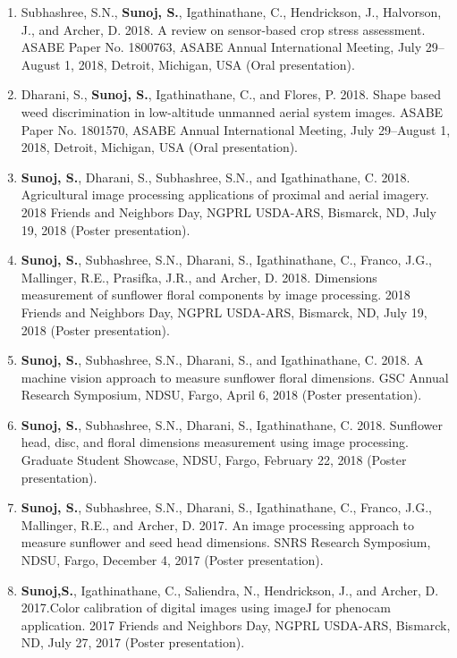 \documentclass[11pt]{article}
\begin{document}
\begin{enumerate}[itemsep=-2pt]
\item Subhashree, S.N., \textbf{Sunoj, S.}, Igathinathane, C., Hendrickson, J., Halvorson, J., and Archer, D. 2018. A review on sensor-based crop stress assessment. ASABE Paper No. 1800763, ASABE Annual International Meeting, July 29--August 1, 2018, Detroit, Michigan, USA (Oral presentation).

\item  Dharani, S., \textbf{Sunoj, S.}, Igathinathane, C., and Flores, P. 2018. Shape based weed discrimination in low-altitude unmanned aerial system images. ASABE Paper No. 1801570, ASABE Annual International Meeting, July 29--August 1, 2018, Detroit, Michigan, USA (Oral presentation).

\item \textbf{Sunoj, S.}, Dharani, S., Subhashree, S.N., and Igathinathane, C. 2018. Agricultural image processing applications of proximal and aerial imagery. 2018 Friends and Neighbors Day, NGPRL USDA-ARS, Bismarck, ND, July 19, 2018 (Poster presentation).

\item \textbf{Sunoj, S.}, Subhashree, S.N., Dharani, S., Igathinathane, C., Franco, J.G., Mallinger, R.E., Prasifka, J.R., and Archer, D.  2018. Dimensions measurement of sunflower floral components by image processing. 2018 Friends and Neighbors Day, NGPRL USDA-ARS, Bismarck, ND, July 19, 2018 (Poster presentation).

\item \textbf{Sunoj, S.}, Subhashree, S.N., Dharani, S., and Igathinathane, C. 2018. A machine vision approach to measure sunflower floral dimensions. GSC Annual Research Symposium, NDSU, Fargo, April 6, 2018 (Poster presentation).

\item \textbf{Sunoj, S.}, Subhashree, S.N., Dharani, S., Igathinathane, C. 2018. Sunflower head, disc, and floral dimensions measurement using image processing. Graduate Student Showcase, NDSU, Fargo, February 22, 2018 (Poster presentation).

\item \textbf{Sunoj, S.}, Subhashree, S.N., Dharani, S., Igathinathane, C., Franco, J.G., Mallinger, R.E., and Archer, D. 2017. An image processing approach to measure sunflower and seed head dimensions. SNRS Research Symposium, NDSU, Fargo, December 4, 2017 (Poster presentation).

\item \textbf{Sunoj,S.}, Igathinathane, C., Saliendra, N., Hendrickson, J., and Archer, D. 2017.Color calibration of digital images using imageJ for phenocam application. 2017 Friends and Neighbors Day, NGPRL USDA-ARS, Bismarck, ND, July 27, 2017 (Poster presentation).


\end{enumerate}
\end{document}
